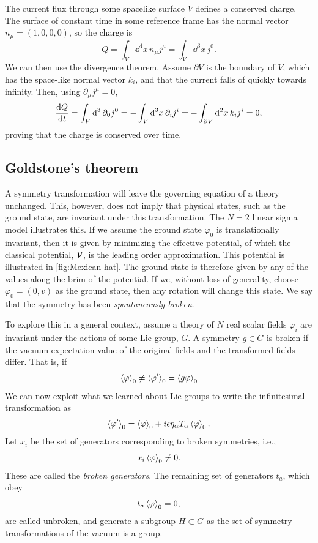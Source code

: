 The current flux through some spacelike surface $V$ defines a conserved charge. The surface of constant time in some reference frame has the normal vector $n_\mu = (1, 0, 0, 0)$, so the charge is
\begin{equation}
    Q = \int_V \dd^4 x \, n_\mu j^\mu = \int_V \dd^3 x \, j^0.
\end{equation}
%
We can then use the divergence theorem.
Assume $\partial V$ is the boundary of $V$, which has the space-like normal vector $k_i$, and that the current falls of quickly towards infinity.
Then, using $\partial_\mu j^\mu = 0 $,
\begin{equation}
    \odv{Q}{t} 
    = \int_V \dd^3 \, \partial_0 j^0
    = - \int_V \dd^3 x \, \partial_i j^i 
    = - \int_{\partial V} \dd^2 x\, k_i j^i 
    = 0,
\end{equation}
%
proving that the charge is conserved over time.

\subsection{Goldstone's theorem}

A symmetry transformation will leave the governing equation of a theory unchanged.
This, however, does not imply that physical states, such as the ground state, are invariant under this transformation.
The $N = 2$ linear sigma model illustrates this.
If we assume the ground state $\varphi_{0}$ is translationally invariant, then it is given by minimizing the effective potential, of which the classical potential, $\mathcal{V}$, is the leading order approximation.
This potential is illustrated in \autoref{fig:Mexican hat}.
The ground state is therefore given by any of the values along the brim of the potential.
If we, without loss of generality, choose $\varphi_0 = (0, v)$ as the ground state, then any rotation will change this state.
We say that the symmetry has been \emph{spontaneously broken}.

To explore this in a general context, assume a theory of $N$ real scalar fields $\varphi_i$ are invariant under the actions of some Lie group, $G$.
A symmetry $g \in G$ is broken if the vacuum expectation value of the original fields and the transformed fields differ.
That is, if
\begin{equation}
    \left\langle \varphi \right\rangle_0 \neq \left\langle \varphi' \right\rangle_0 = \left\langle g \varphi \right\rangle_0
\end{equation}
%
We can now exploit what we learned about Lie groups to write the infinitesimal transformation as
\begin{equation}
    \left\langle \varphi' \right\rangle_0 = \left\langle \varphi \right\rangle_0 + i \epsilon \eta_\alpha T_\alpha \left\langle \varphi \right\rangle_0.
\end{equation}
%
Let $x_i$ be the set of generators corresponding to broken symmetries, i.e.,
\begin{equation}
    x_i \left\langle \varphi \right\rangle_0 \neq 0.
\end{equation}
%
These are called the \emph{broken generators}.
The remaining set of generators $t_a$, which obey
\begin{equation}
    t_a \left\langle \varphi \right\rangle_0 = 0,
\end{equation}
%
are called unbroken, and generate a subgroup $H \subset G$ as the set of symmetry transformations of the vacuum is a group.

